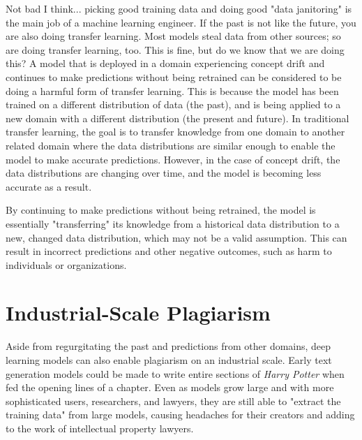 Not bad I think... picking good training data and doing good "data janitoring" is the main job of a machine learning engineer.
If the past is not like the future, you are also doing transfer learning. Most models steal data from other sources; so are doing transfer learning, too. This is fine, but do we know that we are doing this? A model that is deployed in a domain experiencing concept drift and continues to make predictions without being retrained can be considered to be doing a harmful form of transfer learning. This is because the model has been trained on a different distribution of data (the past), and is being applied to a new domain with a different distribution (the present and future).
In traditional transfer learning, the goal is to transfer knowledge from one domain to another related domain where the data distributions are similar enough to enable the model to make accurate predictions. However, in the case of concept drift, the data distributions are changing over time, and the model is becoming less accurate as a result.

By continuing to make predictions without being retrained, the model is essentially "transferring" its knowledge from a historical data distribution to a new, changed data distribution, which may not be a valid assumption. This can result in incorrect predictions and other negative outcomes, such as harm to individuals or organizations.

\section{Industrial-Scale Plagiarism}

Aside from regurgitating the past and predictions from other domains, deep learning models can also enable plagiarism on an industrial scale. Early text generation models could be made to write entire sections of \textit{Harry Potter} when fed the opening lines of a chapter. Even as models grow large and with more sophisticated users, researchers, and lawyers, they are still able to "extract the training data" from large models, causing headaches for their creators and adding to the work of intellectual property lawyers. 

